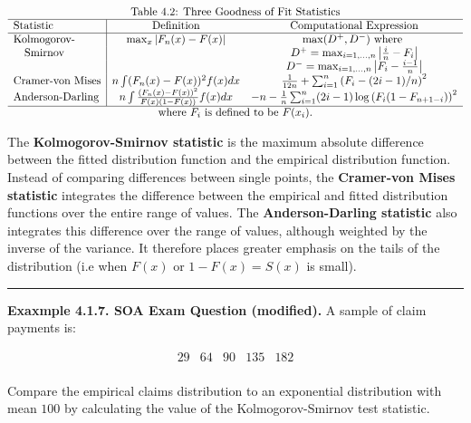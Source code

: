\documentclass[]{book}
\theoremstyle{definition}
\theoremstyle{definition}
\theoremstyle{definition}
\theoremstyle{remark}
\begin{document}
\[\begin{matrix}
\text{Table 4.2: Three Goodness of Fit Statistics} \\
\begin{array}{l|cc}
\hline
\text{Statistic} & \text{Definition} & \text{Computational Expression} \\
\hline 
\text{Kolmogorov-} & \max_x |F_n(x) - F(x)| & \max(D^+, D^-) \text{ where } \\
~~~\text{Smirnov} && D^+ = \max_{i=1, \ldots, n} \left|\frac{i}{n} - F_i\right| \\
&& D^- = \max_{i=1, \ldots, n} \left| F_i - \frac{i-1}{n} \right| \\
\text{Cramer-von Mises} & n \int (F_n(x) - F(x))^2 f(x) dx & \frac{1}{12n} + \sum_{i=1}^n \left(F_i - (2i-1)/n\right)^2 \\
\text{Anderson-Darling} & n \int \frac{(F_n(x) - F(x))^2}{F(x)(1-F(x))} f(x) dx & -n-\frac{1}{n} \sum_{i=1}^n (2i-1) \log\left(F_i(1-F_{n+1-i})\right)^2 \\
\hline
\end{array} \\
\text{where } F_i \text{ is defined to be } F(x_i).
\end{matrix}\]

The \textbf{Kolmogorov-Smirnov statistic} is the maximum absolute
difference between the fitted distribution function and the empirical
distribution function. Instead of comparing differences between single
points, the \textbf{Cramer-von Mises statistic} integrates the
difference between the empirical and fitted distribution functions over
the entire range of values. The \textbf{Anderson-Darling statistic} also
integrates this difference over the range of values, although weighted
by the inverse of the variance. It therefore places greater emphasis on
the tails of the distribution (i.e when \(F(x)\) or \(1-F(x)=S(x)\) is
small).

\begin{center}\rule{0.5\linewidth}{\linethickness}\end{center}

\textbf{Exaxmple 4.1.7. SOA Exam Question (modified).} A sample of claim
payments is:

\[\begin{array}{ccccc}
29 & 64 & 90 & 135 & 182  \\
\end{array}\]

Compare the empirical claims distribution to an exponential distribution
with mean \(100\) by calculating the value of the Kolmogorov-Smirnov
test statistic.
\end{document}
